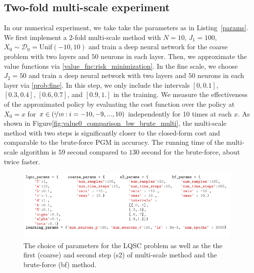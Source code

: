 \documentclass{article}
\numberwithin{equation}{section}
\begin{document}
\subsection{Two-fold multi-scale experiment}

In our numerical experiment, we take take the parameters as in Listing~\eqref{params}.
We first implement a $2$-fold multi-scale method with $N=10$, $J_1=100$, $X_0\sim\mathcal{D}_0=\text{Unif}(-10,10)$ and train a deep neural network for the coarse problem with two layers and $50$ neurons in each layer. Then, we approximate the value functions via \eqref{value_fnc:risk_minimization}. In the fine scale, we choose $J_2=50$ and train a deep neural network with two layers and $50$ neurons in each layer via \eqref{prob:fine}. In this step, we only include the intervals $[0,0.1]$, $[0.3,0.4]$, $[0.6,0.7]$, and $[0.9,1.]$ in the training. 
We measure the effectiveness of the approximated policy by evaluating the cost function over the policy at $X_0=x$ for $x\in (\nicefrac{i}{10}: i=-10,-9,...,10)$ independently for 10 times at each $x$. As shown in Figure\ref{fig:value0_comparison_bw_brute_multi}, the multi-scale method with two steps is significantly closer to the closed-form cost and comparable to the brute-force PGM in accuracy. The running time of the multi-scale algorithm is $59$ second compared to $130$ second for the brute-force, about twice faster. 

\begin{figure}[H]\centering
\includegraphics[width=\textwidth]{figures/ms2_params.pdf}
\caption{The choice of parameters for the LQSC problem as well as the the first (coarse) and second step (s2) of multi-scale method and the brute-force (bf) method.}
    \label{params}
\end{figure}

\end{document}
